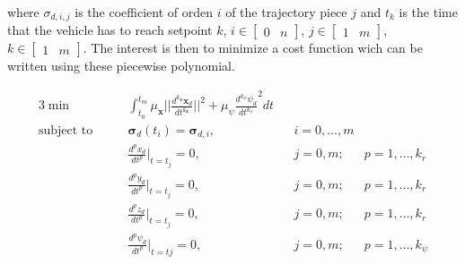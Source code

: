 \noindent where $\sigma_{d,i,j}$ is the coefficient of orden $i$ of the trajectory piece $j$ and $t_k$ is the time that the vehicle has to reach setpoint $k$, $i \in \begin{bmatrix}0 & n\end{bmatrix}$, $j \in \begin{bmatrix}1 & m\end{bmatrix}$, $k \in \begin{bmatrix}1 & m\end{bmatrix}$. The interest is then to minimize a cost function wich can be written using these piecewise polynomial. 

\begin{alignat}{3}
	\min\qquad & \int_{t_0}^{t_m}\mu_{\mathbf{x}} \Bigg|\Bigg|\frac{d^{k_{\mathbf{x}}}\mathbf{x}_d}{dt^{k_{\mathbf{x}}}} \Bigg|\Bigg|^2 + \mu_{\psi}\frac{d^{k_{\psi}}\psi_d}{dt^{k_{\psi}}}^2 dt \\
	\text{subject to}\qquad & \boldsymbol{\sigma}_d(t_i) = \boldsymbol{\sigma}_{d,i}, && i=0,\dots ,m \nonumber \\
	& \frac{d^px_d}{dt^p}\Big|_{t=t_j}=0, && j=0,m; & p=1,\dots ,k_r \nonumber \\
	& \frac{d^py_d}{dt^p}\Big|_{t=t_j}=0, && j=0,m; & p=1,\dots ,k_r \nonumber \\
	& \frac{d^pz_d}{dt^p}\Big|_{t=t_j}=0, && j=0,m; & p=1,\dots ,k_r \nonumber \\
	& \frac{d^p\psi_d}{dt^p}\Big|_{t=tj}=0, && j=0,m; & p=1,\dots ,k_{\psi} \nonumber
	\label{eq:minimizationCost}
\end{alignat}

